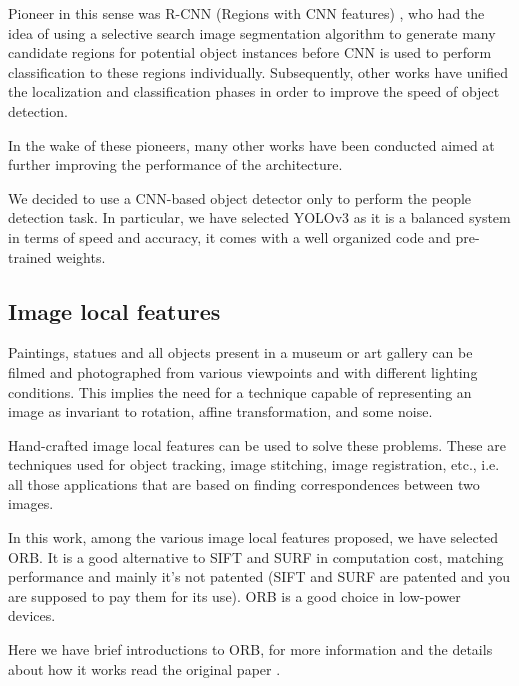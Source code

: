 \documentclass[10pt,twocolumn,letterpaper]{article}
\begin{document}
Pioneer in this sense was R-CNN (Regions with CNN features) \cite{girshick2014rich}, who had the idea of ​​using a selective search \cite{uijlings2013selective} image segmentation algorithm to generate many candidate regions for potential object instances before CNN is used to perform classification to these regions individually. Subsequently, other \cite{girshick2015fast, ren2015faster} works have unified the localization and classification phases in order to improve the speed of object detection.

In the wake of these pioneers, many other works have been conducted \cite{dai2016r, kim2016pvanet, lin2017feature, liu2016ssd, redmon2017yolo9000, redmon2016you, shrivastava2016training, redmon2018yolov3} aimed at further improving the performance of the architecture.

We decided to use a CNN-based object detector only to perform the people detection task. In particular, we have selected YOLOv3 as it is a balanced system in terms of speed and accuracy, it comes with a well organized code and pre-trained weights.


\subsection{Image local features}
Paintings, statues and all objects present in a museum or art gallery can be filmed and photographed from various viewpoints and with different lighting conditions. This implies the need for a technique capable of representing an image as invariant to rotation, affine transformation, and some noise.

Hand-crafted image local features \cite{rublee2011orb,alahi2012freak,bay2006surf,jain2000statistical,leutenegger2011brisk,lowe2004distinctive,morel2009asift} can be used to solve these problems. These are techniques used for object tracking, image stitching, image registration, etc., i.e. all those applications that are based on finding correspondences between two images.

In this work, among the various image local features proposed, we have selected ORB. It is a good alternative to SIFT and SURF in computation cost, matching performance and mainly it's not patented (SIFT and SURF are patented and you are supposed to pay them for its use). ORB is a good choice in low-power devices.

Here we have brief introductions to ORB, for more information and the details about how it works read the original paper \cite{rublee2011orb}.
\end{document}
